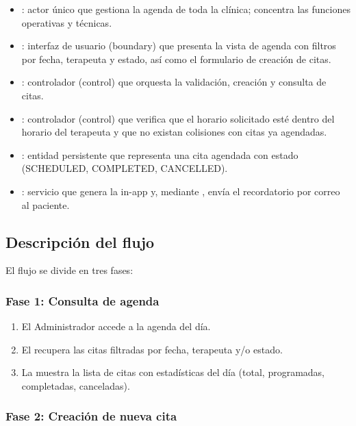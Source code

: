 \begin{itemize}
  \item {}: actor único que gestiona la agenda de toda la clínica; concentra las funciones operativas y técnicas.
  \item {}: interfaz de usuario (boundary) que presenta la vista de agenda con filtros por fecha, terapeuta y estado, así como el formulario de creación de citas.
  \item {}: controlador (control) que orquesta la validación, creación y consulta de citas.
  \item {}: controlador (control) que verifica que el horario solicitado esté dentro del horario del terapeuta y que no existan colisiones con citas ya agendadas.
  \item {}: entidad persistente que representa una cita agendada con estado (SCHEDULED, COMPLETED, CANCELLED).
  \item {}: servicio que genera la  in-app y, mediante , envía el recordatorio por correo al paciente.
\end{itemize}

\subsection{Descripción del flujo}

El flujo se divide en tres fases:

\subsubsection{Fase 1: Consulta de agenda}

\begin{enumerate}
  \item El Administrador accede a la agenda del día.
  \item El  recupera las citas filtradas por fecha, terapeuta y/o estado.
  \item La  muestra la lista de citas con estadísticas del día (total, programadas, completadas, canceladas).
\end{enumerate}

\subsubsection{Fase 2: Creación de nueva cita}

